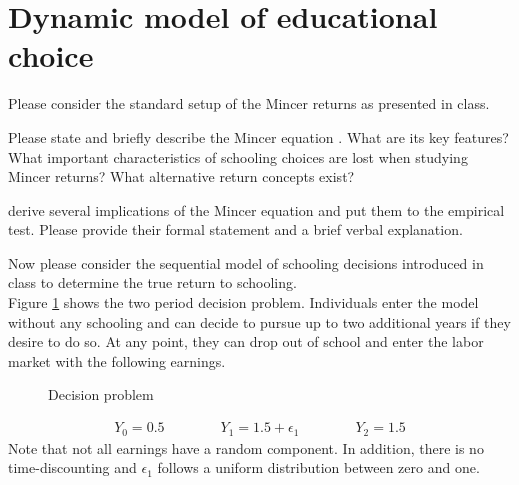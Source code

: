 \FloatBarrier\section{Dynamic model of educational choice}

Please consider the standard setup of the Mincer returns as presented in class.

\begin{boenumerate}

\item Please state and briefly describe the Mincer equation \citep{Mincer.1974}. What are its key features? What important characteristics of schooling choices are lost when studying Mincer returns? What alternative return concepts exist?

\item \citet{Heckman.2006a} derive several implications of the Mincer equation and put them to the empirical test. Please provide their formal statement and a brief verbal explanation.

\end{boenumerate}\vspace{0.3cm}

Now please consider the sequential model of schooling decisions introduced in class to determine the true return to schooling.\\

Figure \ref{Decision problem} shows the two period decision problem. Individuals enter the model without any schooling and can decide to pursue up to two additional years if they desire to do so. At any point, they can drop out of school and enter the labor market with the following earnings.
%
\begin{figure}[htp]\centering
\caption{Decision problem}\label{Decision problem}
\end{figure}
%
\begin{align*}
Y_0 = 0.5 \qquad\qquad Y_1 = 1.5 + \epsilon_1 \qquad\qquad Y_2 = 1.5
\end{align*}
%
Note that not all earnings have a random component. In addition, there is no time-discounting and $\epsilon_1$ follows a uniform distribution between zero and one.

